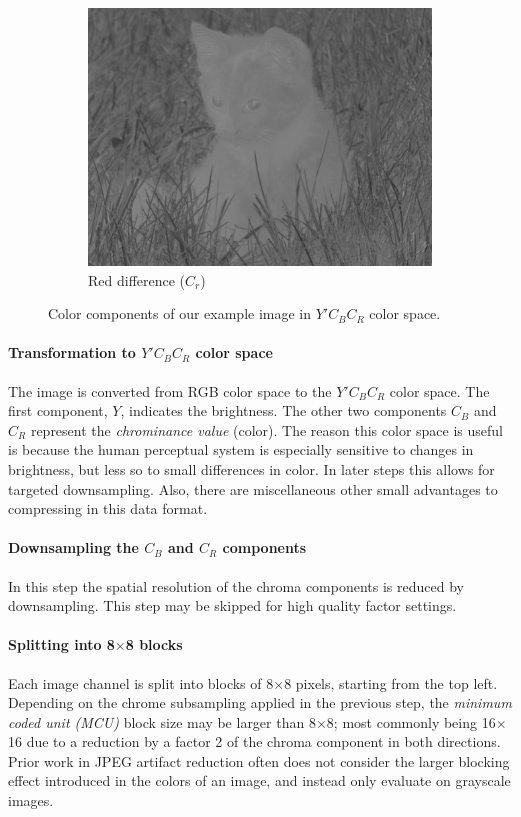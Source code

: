 \begin{figure}[ht]
\begin{subfigure}{.33\textwidth}
  \includegraphics[width=.98\linewidth]{../images/compression_examples/ycrcb_2}
  \caption{Red difference ($C_r$)}
\end{subfigure}%
\caption{Color components of our example image in $Y'C_BC_R$ color space.}
\label{fig_compression_qf}
\end{figure}

\paragraph{Transformation to $Y'C_BC_R$ color space} The image is converted from RGB color space to the $Y'C_BC_R$ color space. The first component, $Y$, indicates the brightness. The other two components $C_B$ and $C_R$ represent the \emph{chrominance value} (color). The reason this color space is useful is because the human perceptual system is especially sensitive to changes in brightness, but less so to small differences in color. In later steps this allows for targeted downsampling. Also, there are miscellaneous other small advantages to compressing in this data format.

\paragraph{Downsampling the $C_B$ and $C_R$ components}
In this step the spatial resolution of the chroma components is reduced by downsampling. This step may be skipped for high quality factor settings.

\paragraph{Splitting into 8$\times$8 blocks}
Each image channel is split into blocks of 8$\times$8 pixels, starting from the top left. Depending on the chrome subsampling applied in the previous step, the \emph{minimum coded unit (MCU)} block size may be larger than 8$\times$8; most commonly being 16$\times$16 due to a reduction by a factor 2 of the chroma component in both directions. Prior work in JPEG artifact reduction often does not consider the larger blocking effect introduced in the colors of an image, and instead only evaluate on grayscale images.

